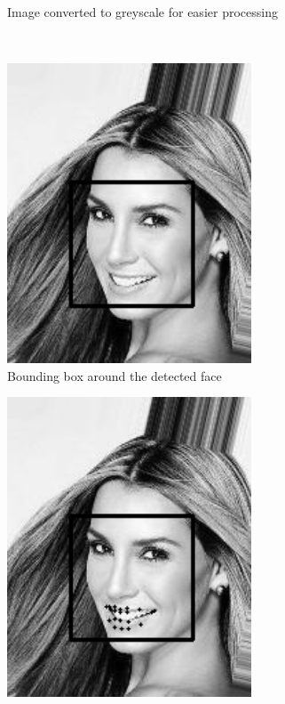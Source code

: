 \documentclass{article}
\begin{document}
\begin{figure}[htb]
\begin{subfigure}{0.2\textwidth}
 				\caption{Image converted to greyscale for easier processing}
 				\label{fig:a2_greyscale_img}	
 			\end{subfigure}
 			\\
 			\begin{subfigure}{0.2\textwidth}
 				\centering
 				\includegraphics[width=0.8\textwidth]{a2_face_bb.png}
 				\caption{Bounding box around the detected face}
 				\label{fig:a2_face_bb}	
 			\end{subfigure}
 			\hspace{1em}
 			\begin{subfigure}{0.2\textwidth}
 				\centering
 				\includegraphics[width=0.8\textwidth]{a2_mouth_landmarks.png}

\end{subfigure}
\end{figure}
\end{document}
